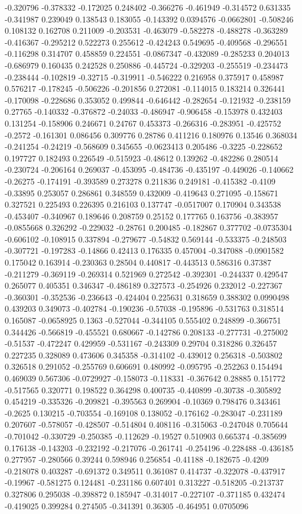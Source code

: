 -0.320796 -0.378332 -0.172025 0.248402 -0.366276 -0.461949 -0.314572 0.631335 -0.341987 0.239049 0.138543 0.183055 -0.143392 0.0394576 -0.0662801 -0.508246 0.108132 0.162708 0.211009 -0.203531 -0.463079 -0.582278 -0.488278 -0.363289 -0.416367 -0.295212 0.522273 0.255612 -0.424243 0.549695 -0.409568 -0.296551 -0.116298 0.314707 0.458859 0.224551 -0.0867347 -0.432089 -0.285233 0.204013 -0.686979 0.160435 0.242528 0.250886 -0.445724 -0.329203 -0.255519 -0.234473 -0.238444 -0.102819 -0.32715 -0.319911 -0.546222 0.216958 0.375917 0.458987 0.576217 -0.178245 -0.506226 -0.201856 0.272081 -0.114015 0.183214 0.326441 -0.170098 -0.228686 0.353052 0.499844 -0.646442 -0.282654 -0.121932 -0.238159 0.27765 -0.140332 -0.376872 -0.24033 -0.486947 -0.906458 -0.153978 0.432403 0.131254 -0.158906 0.246671 0.24767 0.453373 -0.266316 -0.283951 -0.425752 -0.2572 -0.161301 0.086456 0.309776 0.28786 0.411216 0.180976 0.13546 0.368034 -0.241254 -0.24219 -0.568609 0.345655 -0.0623413 0.205486 -0.3225 -0.228652 0.197727 0.182493 0.226549 -0.515923 -0.48612 0.139262 -0.482286 0.280514 -0.230724 -0.206164 0.269037 -0.453095 -0.484736 -0.435197 -0.449026 -0.140662 -0.26275 -0.174191 -0.393589 0.273278 0.211836 0.249181 -0.415382 -0.4109 -0.33895 0.253057 0.286861 0.348559 0.432009 -0.419643 0.271095 -0.158671 0.327521 0.225493 0.226395 0.216103 0.137747 -0.0517007 0.170904 0.343538 -0.453407 -0.340967 0.189646 0.208759 0.25152 0.177765 0.163756 -0.383957 -0.0855668 0.326292 -0.229032 -0.28761 0.200485 -0.182867 0.377702 -0.0735304 -0.606102 -0.108915 0.337894 -0.279677 -0.54832 0.569144 -0.533375 -0.248503 -0.307721 -0.197283 -0.14866 0.42413 0.176335 0.457004 -0.347088 -0.0901582 0.175042 0.163914 -0.230363 0.28504 0.440817 -0.443513 0.586316 0.37387 -0.211279 -0.369119 -0.269314 0.521969 0.272542 -0.392301 -0.244337 0.429547 0.265077 0.405351 0.346347 -0.486189 0.327573 -0.254926 0.232012 -0.227367 -0.360301 -0.352536 -0.236643 -0.424404 0.225631 0.318659 0.388302 0.0990498 0.439203 0.349073 -0.402784 -0.190236 -0.57038 -0.195896 -0.531763 0.318514 0.165087 -0.0658925 0.1363 -0.527044 -0.344105 0.555402 0.248899 -0.366751 0.344426 -0.566819 -0.455521 0.680667 -0.142786 0.208133 -0.277731 -0.275002 -0.51537 -0.472247 0.429959 -0.531167 -0.243309 0.29704 0.318286 0.326457 0.227235 0.328089 0.473606 0.345358 -0.314102 -0.439012 0.256318 -0.503802 0.326518 0.291052 -0.255769 0.606691 0.480992 -0.095795 -0.252263 0.154494 0.469039 0.567306 -0.0729927 -0.158073 -0.118331 -0.367642 0.28885 0.151772 -0.517565 0.320771 0.198522 0.364298 0.400735 -0.440899 -0.30738 -0.305892 0.454219 -0.335326 -0.209821 -0.395563 0.269904 -0.10369 0.798476 0.343461 -0.2625 0.130215 -0.703554 -0.169108 0.138052 -0.176162 -0.283047 -0.231189 0.207607 -0.578057 -0.428507 -0.514804 0.408116 -0.315063 -0.247048 0.705644 -0.701042 -0.330729 -0.250385 -0.112629 -0.19527 0.510903 0.665374 -0.385699 0.176138 -0.143203 -0.232192 -0.217076 -0.261741 -0.254196 -0.228488 -0.436185 0.277957 -0.280566 0.39244 0.598946 0.256854 -0.41188 -0.182675 -0.4209 -0.218078 0.403287 -0.691372 0.349511 0.361087 0.414737 -0.322078 -0.437917 -0.19967 -0.581275 0.124481 -0.231186 0.607401 0.313227 -0.518205 -0.213737 0.327806 0.295038 -0.398872 0.185947 -0.314017 -0.227107 -0.371185 0.432474 -0.419025 0.399284 0.274505 -0.341391 0.36305 -0.464951 0.0705096 